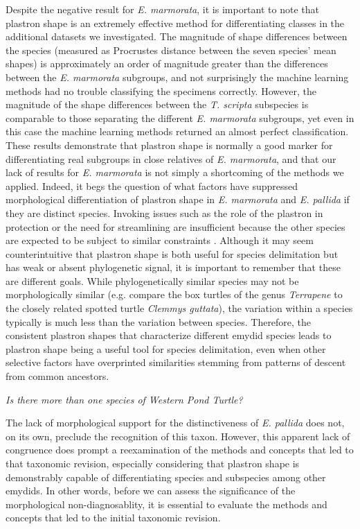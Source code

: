 \documentclass[12pt,letterpaper]{article}
\renewcommand{\subsection}[1]{%
\bigskip
\begin{center}
\begin{large}
\normalfont\itshape #1
\end{large}
\end{center}}
\begin{document}
Despite the negative result for \textit{E. marmorata}, it is important to note that plastron shape is an extremely effective method for differentiating classes in the additional datasets we investigated. The magnitude of shape differences between the species (measured as Procrustes distance between the seven species' mean shapes) is approximately an order of magnitude greater than the differences between the \textit{E. marmorata} subgroups, and not surprisingly the machine learning methods had no trouble classifying the specimens correctly. However, the magnitude of the shape differences between the \textit{T. scripta} subspecies is comparable to those separating the different \textit{E. marmorata} subgroups, yet even in this case the machine learning methods returned an almost perfect classification. These results demonstrate that plastron shape is normally a good marker for differentiating real subgroups in close relatives of \textit{E. marmorata}, and that our lack of results for \textit{E. marmorata} is not simply a shortcoming of the methods we applied. Indeed, it begs the question of what factors have suppressed morphological differentiation of plastron shape in \textit{E. marmorata} and \textit{E. pallida} if they are distinct species. Invoking issues such as the role of the plastron in protection or the need for streamlining are insufficient because the other species are expected to be subject to similar constraints \citep{Stayton2011,Polly2016}. Although it may seem counterintuitive that plastron shape is both useful for species delimitation but has weak or absent phylogenetic signal, it is important to remember that these are different goals. While phylogenetically similar species may not be morphologically similar (e.g. compare the box turtles of the genus \textit{Terrapene} to the closely related spotted turtle \textit{Clemmys guttata}), the variation within a species typically is much less than the variation between species. Therefore, the consistent plastron shapes that characterize different emydid species leads to plastron shape being a useful tool for species delimitation, even when other selective factors have overprinted similarities stemming from patterns of descent from common ancestors.

\subsection{Is there more than one species of Western Pond Turtle?}

The lack of morphological support for the distinctiveness of \textit{E. pallida} does not, on its own, preclude the recognition of this taxon. However, this apparent lack of congruence does prompt a reexamination of the methods and concepts that led to that taxonomic revision, especially considering that plastron shape is demonstrably capable of differentiating species and subspecies among other emydids. In other words, before we can assess the significance of the morphological non-diagnosablity, it is essential to evaluate the methods and concepts that led to the initial taxonomic revision. 
\end{document}
